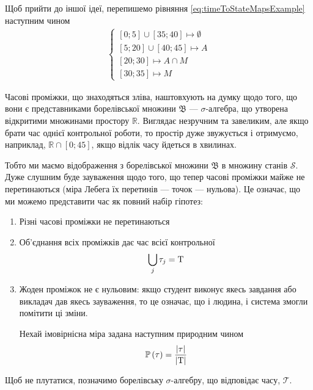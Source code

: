 Щоб прийти до іншої ідеї, перепишемо рівняння \eqref{eq:timeToStateMapsExample}
наступним чином
\begin{align}\label{eq:timeToStateMapsExampleShort}
  \begin{cases}
    \left[ 0; 5 \right] \cup \left[ 35; 40 \right] \mapsto \emptyset \\
    \left[ 5; 20 \right] \cup \left[ 40; 45 \right] \mapsto A \\
    \left[ 20; 30 \right] \mapsto A \cap M \\
    \left[ 30; 35 \right] \mapsto M
  \end{cases}
\end{align}

Часові проміжки, що знаходяться зліва, наштовхують на думку щодо того, що вони
є представниками борелівської множини $\mathfrak{B}$ --- $\sigma$-алгебра, що
утворена відкритими множинами простору $\mathbb{R}$.
Виглядає незручним та завеликим, але якщо брати час однієї контрольної роботи,
то простір дуже звужується і отримуємо, наприклад,
$\mathbb{R} \cap \left[ 0; 45 \right]$, якщо відлік часу йдеться в хвилинах.

Тобто ми маємо відображення з борелівської множини $\mathfrak{B}$ в
множину станів $\mathcal{S}$.
Дуже слушним буде зауваження щодо того, що тепер часові проміжки майже не
перетинаються (міра Лебега їх перетинів --- точок --- нульова).
Це означає, що ми можемо представити час як повний набір гіпотез:
\begin{enumerate}
  \item
    Різні часові проміжки не перетинаються
  \item
    Об’єднання всіх проміжків дає час всієї контрольної
    \begin{equation*}
      \bigcup_j \tau_j = \mathrm{T}
    \end{equation*}
  \item
    Жоден проміжок не є нульовим: якщо студент виконує якесь завдання або
    викладач дав якесь зауваження, то це означає, що і людина, і система змогли
    помітити ці зміни.

    Нехай імовірнісна міра задана наступним природним чином
    \begin{equation*}
      \mathbb{P}\left( \tau \right) = \frac{\left| \tau \right|}{\left| \mathrm{T} \right|}
    \end{equation*}
\end{enumerate}

Щоб не плутатися, позначимо борелівську $\sigma$-алгебру, що відповідає часу,
$\mathcal{T}$.

